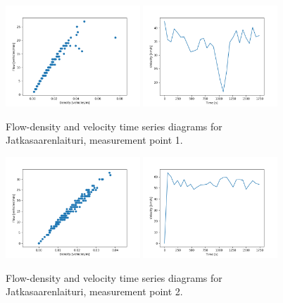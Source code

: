 \documentclass[english, 12pt, a4paper, elec, utf8, pdfa, online]{aaltothesis}
\begin{document}
\clearpage
\begin{figure}[ht!]
    \centering
    \includegraphics[width=0.45\textwidth]{graphs/Jatkasaarenlaituri_1_flw_dns.png}
    \includegraphics[width=0.45\textwidth]{graphs/Jatkasaarenlaituri_1_spd_time_6.png}
    \caption{Flow-density and velocity time series diagrams for Jatkasaarenlaituri, measurement point 1.}
\end{figure}
\begin{figure}[ht!]
    \centering
    \includegraphics[width=0.45\textwidth]{graphs/Jatkasaarenlaituri_2_flw_dns.png}
    \includegraphics[width=0.45\textwidth]{graphs/Jatkasaarenlaituri_2_spd_time_6.png}
    \caption{Flow-density and velocity time series diagrams for Jatkasaarenlaituri, measurement point 2.}
\end{figure}
\end{document}

